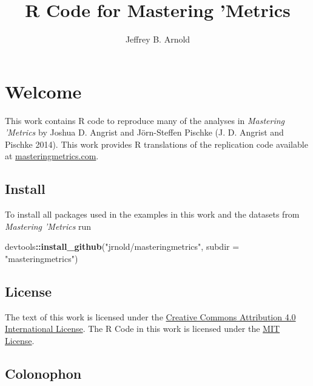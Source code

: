 \documentclass[]{book}
\title{R Code for Mastering 'Metrics}
\author{Jeffrey B. Arnold}
\date{}
\newenvironment{Shaded}{\begin{snugshade}}{\end{snugshade}}
\newcommand{\KeywordTok}[1]{\textcolor[rgb]{0.13,0.29,0.53}{\textbf{#1}}}
\newcommand{\DataTypeTok}[1]{\textcolor[rgb]{0.13,0.29,0.53}{#1}}
\newcommand{\StringTok}[1]{\textcolor[rgb]{0.31,0.60,0.02}{#1}}
\newcommand{\OperatorTok}[1]{\textcolor[rgb]{0.81,0.36,0.00}{\textbf{#1}}}
\newcommand{\NormalTok}[1]{#1}
\theoremstyle{definition}
\theoremstyle{definition}
\theoremstyle{definition}
\theoremstyle{remark}
\begin{document}
\maketitle

{
\setcounter{tocdepth}{1}
\tableofcontents
}
\chapter*{Welcome}\label{welcome}

This work contains R code to reproduce many of the analyses in
\emph{Mastering 'Metrics} by Joshua D. Angrist and Jörn-Steffen Pischke
(J. D. Angrist and Pischke 2014). This work provides R translations of
the replication code available at
\href{http://masteringmetrics.com/resources/}{masteringmetrics.com}.

\section*{Install}\label{install}

To install all packages used in the examples in this work and the
datasets from \emph{Mastering 'Metrics} run

\begin{Shaded}
\begin{Highlighting}[]
\NormalTok{devtools}\OperatorTok{::}\KeywordTok{install_github}\NormalTok{(}\StringTok{"jrnold/masteringmetrics"}\NormalTok{, }\DataTypeTok{subdir =} \StringTok{"masteringmetrics"}\NormalTok{)}
\end{Highlighting}
\end{Shaded}

\section*{License}\label{license}

The text of this work is licensed under the
\href{http://creativecommons.org/licenses/by/4.0/}{Creative Commons
Attribution 4.0 International License}. The R Code in this work is
licensed under the \href{https://opensource.org/licenses/MIT}{MIT
License}.

\section*{Colonophon}\label{colonophon}
\end{document}
